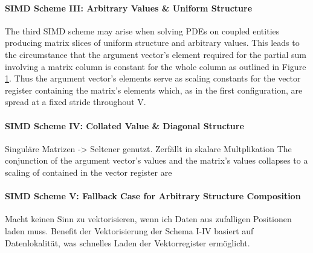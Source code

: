         \paragraph{SIMD Scheme III: Arbitrary Values \& Uniform Structure}

          The third SIMD scheme may arise when solving PDEs on coupled entities producing matrix slices of uniform
          structure and arbitrary values. This leads to the circumstance that the argument vector's element required for
          the partial sum involving a matrix column is constant for the whole column as outlined in Figure
          \ref{fig:simd-scheme-iii-data-layout}. Thus the argument vector's elements serve as scaling constants for the
          vector register containing the matrix's elements which, as in the first configuration, are spread at a fixed
          stride throughout V.

          \begin{figure}[ht]
            \centering
            \captionsetup{width=0.9\columnwidth}
            
            \label{fig:simd-scheme-iii-data-layout}
          \end{figure}

        \paragraph{SIMD Scheme IV: Collated Value \& Diagonal Structure}

          Singuläre Matrizen -> Seltener genutzt. Zerfällt in skalare Multplikation The conjunction of the argument
          vector's values and the matrix's values collapses to a scaling of contained in the vector register are

        \paragraph{SIMD Scheme V: Fallback Case for Arbitrary Structure Composition}

          Macht keinen Sinn zu vektorisieren, wenn ich Daten aus zufalligen Positionen laden muss. Benefit der
          Vektorisierung der Schema I-IV basiert auf Datenlokalität, was schnelles Laden der Vektorregister ermöglicht.
